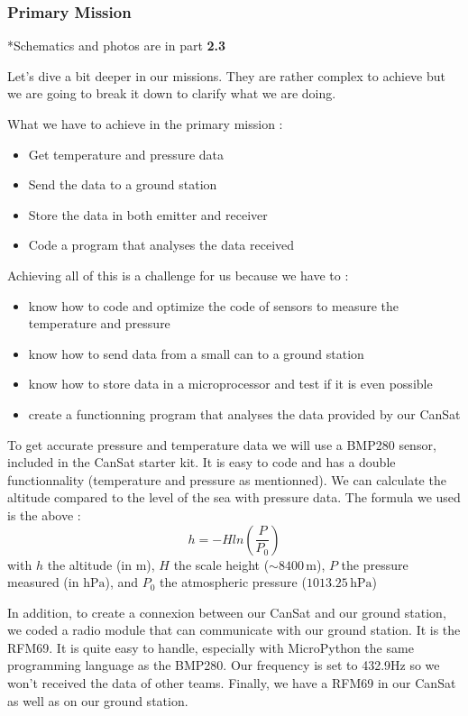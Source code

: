 \documentclass[]{article}
\begin{document}
\subsubsection{Primary Mission}

*Schematics and photos are in part \textbf{2.3}

Let's dive a bit deeper in our missions. They are rather complex to achieve but we are going to break it down
to clarify what we are doing. 

What we have to achieve in the primary mission : 
\begin{itemize}[left=4em]
    \item Get temperature and pressure data
    \item Send the data to a ground station
    \item Store the data in both emitter and receiver
    \item Code a program that analyses the data received
\end{itemize}

Achieving all of this is a challenge for us because we have to : 
\begin{itemize}[left=4em]
    \item know how to code and optimize the code of sensors to measure the temperature and pressure 
    \item know how to send data from a small can to a ground station
    \item know how to store data in a microprocessor and test if it is even possible
    \item create a functionning program that analyses the data provided by our CanSat
\end{itemize}

To get accurate pressure and temperature data we will use a BMP280 sensor, included in the CanSat 
starter kit. It is easy to code and has a double functionnality (temperature and pressure as mentionned).
We can calculate the altitude compared to the level of the sea with pressure data. The formula we used
is the above :
$${h = -Hln(\frac{P}{P_0})}$$
with \( h \) the altitude (in \( \text{m} \)), \( H \) the scale height (\( \sim 8400 \, \text{m} \)), 
\( P \) the pressure measured (in \( \text{hPa} \)), and \( P_0 \) the atmospheric pressure (\( 1013.25 \, 
\text{hPa} \))


In addition, to create a connexion between our CanSat and our ground station, we coded a radio module
that can communicate with our ground station. It is the RFM69. It is quite easy to handle, especially 
with MicroPython the same programming language as the BMP280. Our frequency is set to 432.9Hz so we
won't received the data of other teams. Finally, we have a RFM69 in our CanSat as well as on our 
ground station. 
\end{document}
